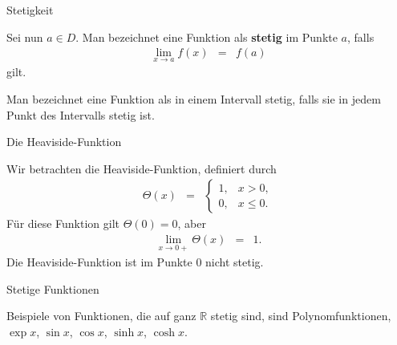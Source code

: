 \documentclass[german]{beamer}
\newcommand{\bq}{\begin{eqnarray*}}
\newcommand{\eq}{\end{eqnarray*}}
\begin{document}
\begin{frame}{Stetigkeit}

\begin{definition}
Sei nun $a\in D$. Man bezeichnet eine Funktion als {\bf stetig} im Punkte $a$,
falls
\bq
 \lim\limits_{x \rightarrow a} f(x) & = & f(a)
\eq
gilt.
\end{definition}

\begin{definition}
Man bezeichnet eine Funktion als in einem Intervall stetig, falls sie in jedem Punkt des
Intervalls stetig ist.
\end{definition}

\end{frame}

\begin{frame}{Die Heaviside-Funktion}

\begin{example}
Wir betrachten die Heaviside-Funktion, definiert durch
\bq
 \Theta(x) & = & \left\{
 \begin{array}{ll}
 1, & x>0, \\
 0, & x \le 0.
 \end{array} \right.
\eq
F\"ur diese Funktion gilt $\Theta(0)=0$, aber
\bq 
\lim\limits_{x\rightarrow 0+} \Theta(x) & = & 1.
\eq
Die Heaviside-Funktion ist im Punkte $0$ nicht stetig.
\end{example}

\end{frame}

\begin{frame}{Stetige Funktionen}

\begin{example}
Beispiele von Funktionen, die auf ganz $\mathbb R$ stetig sind, sind
Polynomfunktionen, $\exp x$, $\sin x$, $\cos x$, $\sinh x$, $\cosh x$.
\end{example}

\end{frame}
\end{document}
